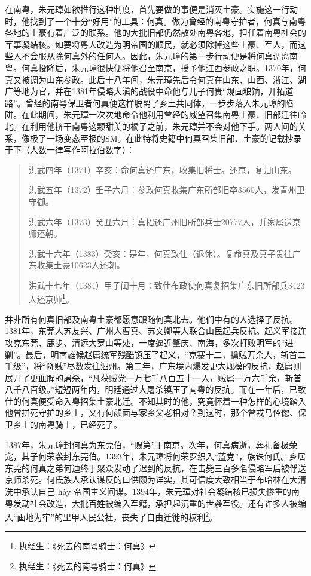 在南粤，朱元璋如欲推行这种制度，首先要做的事便是消灭土豪。实施这一行动时，他找到了一个十分“好用”的工具：何真。做为曾经的南粤守护者，何真与南粤各地的土豪有着广泛的联系。他的大批旧部仍然散处南粤各地，担任着南粤社会的军事凝结核。如要将粤人改造为明帝国的顺民，就必须除掉这些土豪、军人，而这些人不会服从除何真外的任何人。因此，朱元璋的第一步行动便是将何真调离南粤。何真投降后，朱元璋很快便将他召至南京，授予他江西参政之职。1370年，何真又被调为山东参政。此后十八年间，朱元璋先后令何真在山东、山西、浙江、湖广等地为官，并在1381年侵略大滇的战役中命他与儿子何贵“规画粮饷，开拓道路”。曾经的南粤保卫者何真便这样脱离了乡土共同体，一步步落入朱元璋的陷阱。在此期间，朱元璋一次次地命令他利用曾经的威望召集南粤土豪、旧部迁往岭北。在利用他挤干南粤这颗甜美的橘子之前，朱元璋并不会对他下手。两人间的关系，像极了一场变态至极的SM。在此特将史籍中何真召集旧部、土豪的记载抄录于下（人数一律写作阿拉伯数字）：

\begin{quote}
	
洪武四年（1371）辛亥：命何真还广东，收集旧将士。还京，复归山东。

洪武五年（1372）壬子六月：参政何真收集广东所部旧卒3560人，发青州卫守御。

洪武六年（1373）癸丑六月：真招还广州旧所部兵士20777人，并家属送京师还朝。

洪武十六年（1383）癸亥：是年，何真致仕（退休）。复命真及真子贵往广东收集土豪10623人还朝。

洪武十七年（1384）甲子闰十月：致仕布政使何真复招集广东旧所部兵3423人还京师\footnote{执经生：《死去的南粤骑士：何真》}。

\end{quote}

并非所有何真旧部及南粤土豪都愿意跟随何真北去。他们中有的人选择了反抗。1381年，东莞人苏友兴、广州人曹真、苏文卿等人联合山民起兵反抗。起义军接连攻克东莞、鹿步、清远大罗山等处，一度逼近肇庆、南海，多次打败明军的“进剿”。最后，明南雄候赵庸统军残酷镇压了起义，“克寨十二，擒贼万余人，斩首二千级”，将“降贼”尽数发往泗州。第二年，广东境内爆发更大规模的反抗，赵庸则展开了更血腥的屠杀，“凡获贼党一万七千八百五十一人，贼属一万六千余，斩首八千八百级。”短短两年内，明廷通过大屠杀镇压了南粤的反抗。而在一年后，已致仕的何真便受命入粤招集土豪北迁。不知其时的他，究竟怀着一种怎样的心境踏入他曾拼死守护的乡土，又有何颜面与家乡父老相对？到这时，那个曾戎马倥偬、保卫乡土的南粤骑士，已经死了。

1387年，朱元璋封何真为东莞伯，“赐第”于南京。次年，何真病逝，葬礼备极荣宠，其子何荣袭封东莞伯。1393年，朱元璋将何荣罗织入“蓝党”，族诛何氏。乡居东莞的何真之弟何迪终于聚众发动了迟到的反抗，在击毙三百多名侵略军后被俘送京师杀死。何氏族人承认谋反的口供颇为详实，其可信度大致相当于布哈林在大清洗中承认自己 hày 帝国主义间谍。1394年，朱元璋对社会凝结核已损失惨重的南粤发动社会改造，大批百姓被编入军籍，承担起沉重的世袭军役。还有许多人被编入“画地为牢”的里甲人民公社，丧失了自由迁徙的权利\footnote{执经生：《死去的南粤骑士：何真》}。


